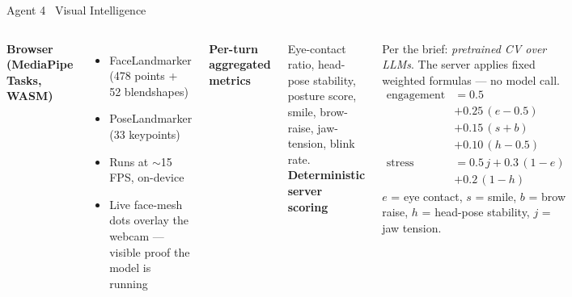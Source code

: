 \documentclass[aspectratio=169,10pt]{beamer}
\newcommand{\biglabel}[1]{\textcolor{brand}{\bfseries\large #1}}
\begin{document}
\begin{frame}{Agent 4 \textbullet\ Visual Intelligence}
  \vspace{0.2cm}
  \begin{columns}[T,onlytextwidth]
      \biglabel{Browser (MediaPipe Tasks, WASM)}\par\smallskip
      \footnotesize
      \begin{itemize}\setlength\itemsep{1pt}
        \item FaceLandmarker (478 points + 52 blendshapes)
        \item PoseLandmarker (33 keypoints)
        \item Runs at $\sim$15 FPS, on-device
        \item Live face-mesh dots overlay the webcam --- visible proof the model is running
      \end{itemize}

      \vspace{0.5em}
      \biglabel{Per-turn aggregated metrics}\par\smallskip
      \footnotesize
      Eye-contact ratio, head-pose stability, posture score, smile,
      brow-raise, jaw-tension, blink rate.
      \biglabel{Deterministic server scoring}\par\smallskip
      \footnotesize Per the brief: \emph{pretrained CV over LLMs}. The
      server applies fixed weighted formulas --- no model call.
      \vspace{4pt}
      \scriptsize
      \begin{align*}
        \mathrm{engagement} &= 0.5 \\
                            &+ 0.25\,(e - 0.5) \\
                            &+ 0.15\,(s + b) \\
                            &+ 0.10\,(h - 0.5) \\[4pt]
        \mathrm{stress}     &= 0.5\,j + 0.3\,(1 - e) \\
                            &+ 0.2\,(1 - h)
      \end{align*}
      \tiny\color{slidefg!75}
      $e$ = eye contact, $s$ = smile, $b$ = brow raise, $h$ = head-pose
      stability, $j$ = jaw tension.
  \end{columns}
\end{frame}
\end{document}
